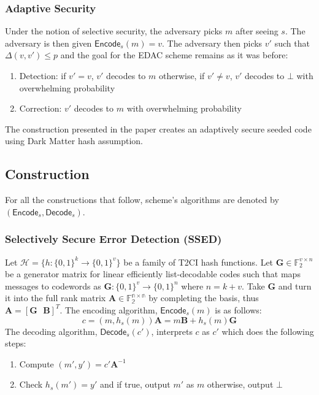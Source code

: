 \documentclass[12pt]{article}%
\begin{document}
 \subsubsection{Adaptive Security}

  Under the notion of selective security, the adversary picks $m$ after seeing $s$. The adversary is then given $\mathsf{Encode}_s(m) = v$. The adversary then picks $v'$ such that $\Delta(v, v') \leq p$ and the goal for the EDAC scheme remains as it was before: \begin{enumerate}
      \item Detection: if $v' = v$, $v'$ decodes to $m$ otherwise, if $v' \neq v$, $v'$ decodes to $\bot$ with overwhelming probability
      \item Correction: $v'$ decodes to $m$ with overwhelming probability 
  \end{enumerate} The construction presented in the paper creates an adaptively secure seeded code using Dark Matter hash assumption. 

\subsection{Construction}
For all the constructions that follow, scheme's algorithms are denoted by $(\textsf{Encode}_s, \textsf{Decode}_s)$. 

\subsubsection{Selectively Secure Error Detection (SSED)}

Let $\mathcal{H} = \{h:\{0, 1\}^k \to \{0, 1\}^v\}$ be a family of T2CI hash functions. Let $\textbf{G} \in \mathbb{F}_2^{v \times n}$ be a generator matrix for linear efficiently list-decodable codes such that maps messages to codewords as $\textbf{G}: \{0, 1\}^v \to \{0, 1\}^n$ where $n = k +v$. Take $\textbf{G}$ and turn it into the full rank matrix $\textbf{A} \in \mathbb{F_2^{n \times n}}$ by completing the basis, thus $\textbf{A} = [\textbf{G} \text{ } \textbf{B}]^T$. The encoding algorithm, $\textsf{Encode}_s(m)$ is as follows: $$c = (m, h_s(m))\textbf{A} = m\textbf{B} + h_s(m)\textbf{G}$$ The decoding algorithm, $\textsf{Decode}_s(c')$, interprets $c$ as $c'$ which does the following steps: \begin{enumerate}
    \item Compute $(m' , y') = c' \textbf{A}^{-1}$
    \item Check $h_s(m') = y'$ and if true, output $m'$ as $m$ otherwise, output $\bot$ 
\end{enumerate}
\end{document}
